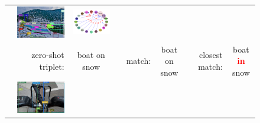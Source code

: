 \begin{figure}
\begin{tabular}{p{0.3cm}|rc|p{0.1cm}rc|p{0.1cm}rc}
		& \includegraphics[width=\figwidthvis, align=c]{2337395_baseline_zs_ours.png} & 
		\includegraphics[width=\figwidthvis, align=c]{2337395_baseline_zs_graph_ours.png} \Tstrutmore\Bstrut\\
		& zero-shot triplet: & {boat on snow} & & match: & boat on snow & & closest match: & {boat \textcolor{red}{\textbf{in}} snow} \Bstrut\\
		\cline{2-9} 
		& \includegraphics[width=\figwidthvis, align=c]{2412160_baseline_zs.png} &

\end{tabular}
\end{figure}
